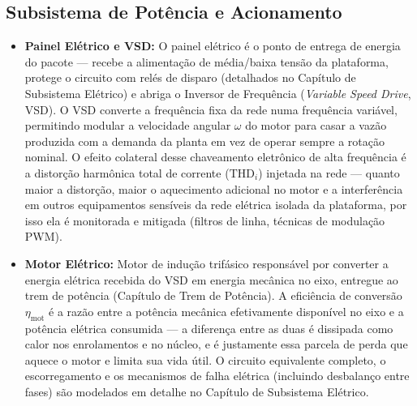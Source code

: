 \documentclass[12pt,a4paper]{article}
\numberwithin{equation}{section}
\numberwithin{table}{section}
\numberwithin{figure}{section}
\begin{document}
	\subsection{\textbf{Subsistema de Potência e Acionamento}}
	\begin{itemize}
		\item \textbf{Painel Elétrico e VSD:} O painel elétrico é o ponto de entrega de energia do pacote — recebe a alimentação de média/baixa tensão da plataforma, protege o circuito com relés de disparo (detalhados no Capítulo de Subsistema Elétrico) e abriga o Inversor de Frequência (\textit{Variable Speed Drive}, VSD). O VSD converte a frequência fixa da rede numa frequência variável, permitindo modular a velocidade angular $\omega$ do motor para casar a vazão produzida com a demanda da planta em vez de operar sempre a rotação nominal. O efeito colateral desse chaveamento eletrônico de alta frequência é a distorção harmônica total de corrente ($\text{THD}_i$) injetada na rede — quanto maior a distorção, maior o aquecimento adicional no motor e a interferência em outros equipamentos sensíveis da rede elétrica isolada da plataforma, por isso ela é monitorada e mitigada (filtros de linha, técnicas de modulação PWM).
		\item \textbf{Motor Elétrico:} Motor de indução trifásico responsável por converter a energia elétrica recebida do VSD em energia mecânica no eixo, entregue ao trem de potência (Capítulo de Trem de Potência). A eficiência de conversão $\eta_{\text{mot}}$ é a razão entre a potência mecânica efetivamente disponível no eixo e a potência elétrica consumida — a diferença entre as duas é dissipada como calor nos enrolamentos e no núcleo, e é justamente essa parcela de perda que aquece o motor e limita sua vida útil. O circuito equivalente completo, o escorregamento e os mecanismos de falha elétrica (incluindo desbalanço entre fases) são modelados em detalhe no Capítulo de Subsistema Elétrico.
	\end{itemize}
	
\end{document}

